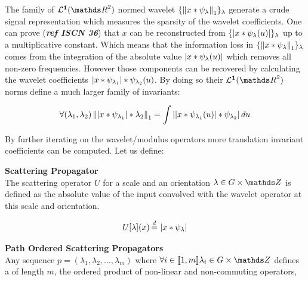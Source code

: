 \documentclass[a4paper,11pt]{report}
\begin{document}
{      The family of $\mathbf{\mathcal{L}^{1}}(\dsR^{2})$ normed wavelet $\{ \left\lVert x \ast \psi_{\lambda} \right\rVert_{1}\}_{\lambda}$ generate a crude signal representation which measures the sparsity of the wavelet coefficients. One can prove (\textbf{\textit{ref ISCN 36}}) that $x$ can be reconstructed from $\{ \left|  x \ast \psi_{\lambda}(u) \right| \}_{\lambda}$ up to a multiplicative constant. Which means that the information loss in $\{ \left\lVert x \ast \psi_{\lambda} \right\rVert_{1} \}_{\lambda}$ comes from the integration of the absolute value $\left|  x \ast \psi_{\lambda}(u) \right|$ which removes all non-zero frequencies. However those components can be recovered by calculating the wavelet coefficients $\left|  x \ast \psi_{\lambda_{1}} \right| \ast \psi_{\lambda_{2}}(u)$. By doing so their $\mathbf{\mathcal{L}^{1}}(\dsR^{2})$ norms define a much larger family of invariants:
      
      \begin{equation*}
				\label{eq:2nd order}
				\forall (\lambda_{1}, \lambda_{2}) 
				\left\lVert  \left|  x \ast \psi_{\lambda_{1}} \right| \ast \lambda_{2} \right\rVert_{1} =
				\int \left|  \left|  x \ast \psi_{\lambda_{1}}(u) \right| \ast \psi_{\lambda_{2}} \right| du
      \end{equation*}          
      
      By further iterating on the wavelet/modulus operators more translation invariant coefficients can be computed. Let us define:
      
      \begin{defn} \textbf{Scattering Propagator}\\ 
				The scattering operator $U$ for a scale and an orientation $\lambda \in G \times \dsZ$ is defined as the absolute value of the input convolved with the wavelet operator at this scale and orientation.
				
				\begin{equation}
					\label{eq:scattering propagator}
					U[\lambda](x) \eqdef \abs{x \ast \psi_{\lambda}}
				\end{equation}
				\label{def:SO}
			\end{defn}
						
			\begin{defn} \textbf{Path Ordered Scattering Propagators}\\ 
				Any sequence $p = (\lambda_{1}, \lambda_{2},\dots ,\lambda_{m})$ where $\forall i \in \llbracket 1,m \rrbracket \lambda_{i} \in G \times \dsZ$ defines a  of length $m$, \ie the ordered product of non-linear and non-commuting operators,
				

\end{defn}}
\end{document}
